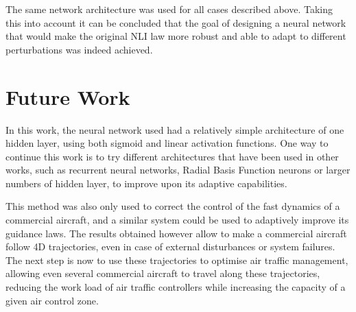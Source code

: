 The same network architecture was used for all cases described above. Taking this into account it can be concluded that the goal of designing a neural network that would make the original NLI law more robust and able to adapt to different perturbations was indeed achieved.

\section{Future Work}
\label{section:future}

In this work, the neural network used had a relatively simple architecture of one hidden layer, using both sigmoid and linear activation functions. One way to continue this work is to try different architectures that have been used in other works, such as recurrent neural networks, Radial Basis Function neurons or larger numbers of hidden layer, to improve upon its adaptive capabilities. 

This method was also only used to correct the control of the fast dynamics of a commercial aircraft, and a similar system could be used to adaptively improve its guidance laws. The results obtained however allow to make a commercial aircraft follow 4D trajectories, even in case of external disturbances or system failures. The next step is now to use these trajectories to optimise air traffic management, allowing even several commercial aircraft to travel along these trajectories, reducing the work load of air traffic controllers while increasing the capacity of a given air control zone.


